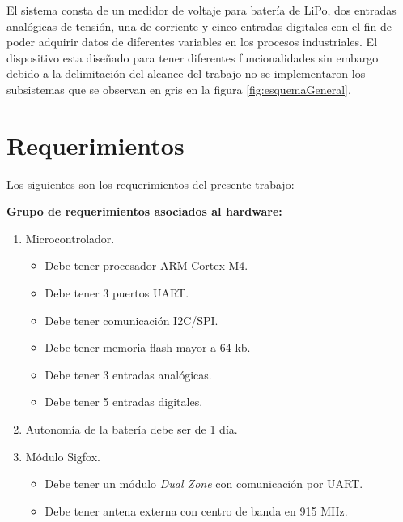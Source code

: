El sistema consta de un medidor de voltaje para batería de LiPo, dos entradas analógicas de tensión, una de corriente y cinco entradas digitales con el fin de poder adquirir datos de diferentes variables en los procesos industriales. El dispositivo esta diseñado para tener diferentes funcionalidades sin embargo debido a la delimitación del alcance del trabajo no se implementaron los subsistemas que se observan en gris en la figura \ref{fig:esquemaGeneral}.


\section{Requerimientos}
Los siguientes son los requerimientos del presente trabajo:

\textbf{Grupo de requerimientos asociados al hardware:}
\begin{enumerate}

	\item Microcontrolador.

	\begin{itemize}

		\item Debe tener procesador ARM Cortex M4.

		\item Debe tener 3 puertos UART.

		\item Debe tener comunicación I2C/SPI.

		\item Debe tener memoria flash mayor a 64 kb.

		\item Debe tener 3 entradas analógicas.

		\item Debe tener 5 entradas digitales.

	\end{itemize}


	\item Autonomía de la batería debe ser de 1 día.

	\item Módulo Sigfox.

		\begin{itemize}

			\item Debe tener un módulo \textit{Dual Zone} con comunicación por UART.

			\item Debe tener antena externa con centro de banda en 915 MHz.


\end{itemize}
\end{enumerate}
